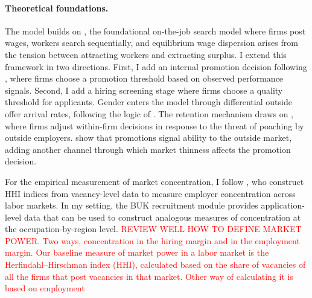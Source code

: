 \documentclass[11pt]{article}
\begin{document}
\paragraph{Theoretical foundations.}
The model builds on \citet{burdett_wage_1998}, the foundational on-the-job search model where firms post wages, workers search sequentially, and equilibrium wage dispersion arises from the tension between attracting workers and extracting surplus. I extend this framework in two directions. First, I add an internal promotion decision following \citet{gibbons_theory_1999}, where firms choose a promotion threshold based on observed performance signals. Second, I add a hiring screening stage where firms choose a quality threshold for applicants. Gender enters the model through differential outside offer arrival rates, following the logic of \citet{sharma_monopsony_2023}. The retention mechanism draws on \citet{postel-vinay_equilibrium_2002}, where firms adjust within-firm decisions in response to the threat of poaching by outside employers. \citet{devaro_signaling_2012} show that promotions signal ability to the outside market, adding another channel through which market thinness affects the promotion decision.


For the empirical measurement of market concentration, I follow \citet{azar_labor_2022}, who construct HHI indices from vacancy-level data to measure employer concentration across labor markets. In my setting, the BUK recruitment module provides application-level data that can be used to construct analogous measures of concentration at the occupation-by-region level.
\textcolor{red}{REVIEW WELL HOW TO DEFINE MARKET POWER. Two ways, concentration in the hiring margin and in the employment margin.}
\textcolor{red}{Our baseline measure of market power in a labor market is the Herfindahl–Hirschman index (HHI), calculated based on the share of vacancies of all the firms that post vacancies in that market.}
\textcolor{red}{Other way of calculating it is based on employment}
\end{document}
